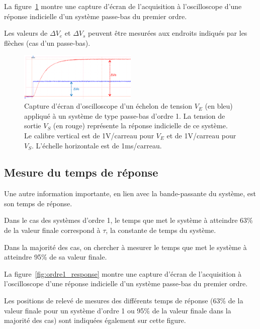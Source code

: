 \medskip

La figure~\ref{fig:ordre1_gain} montre une capture d'écran de l'acquisition à l'oscilloscope d'une réponse indicielle d'un système passe-bas du premier ordre.

Les valeurs de $\Delta{}V_e$ et $\Delta{}V_s$ peuvent être mesurées aux endroits indiqués par les flèches (cas d'un passe-bas).


\begin{figure}[h!]
    \centering
	\includegraphics[width=0.5\textwidth]{images/ri_ordre1_out.png}
	
	
    \caption{Capture d'écran d'oscilloscope d'un échelon de tension $V_E$ (en bleu) appliqué à un système de type passe-bas d'ordre 1. La tension de sortie $V_S$ (en rouge) représente la réponse indicielle de ce système. Le calibre vertical est de 1V/carreau pour $V_E$ et de 1V/carreau pour $V_S$. L'échelle horizontale est de 1ms/carreau.}
    \label{fig:ordre1_gain}
\end{figure}



\subsection{Mesure du temps de réponse}

Une autre information importante, en lien avec la bande-passante du système, est son temps de réponse. 

Dans le cas des systèmes d'ordre 1, le temps que met le système à atteindre 63\% de la valeur finale correspond à $\tau$, la constante de temps du système.

Dans la majorité des cas, on chercher à mesurer le temps que met le système à atteindre 95\% de sa valeur finale.

\medskip

La figure~\ref{fig:ordre1_response} montre une capture d'écran de l'acquisition à l'oscilloscope d'une réponse indicielle d'un système passe-bas du premier ordre.

Les positions de relevé de mesures des différents temps de réponse (63\% de la valeur finale pour un système d'ordre 1 ou 95\% de la valeur finale dans la majorité des cas) sont indiquées également sur cette figure.

